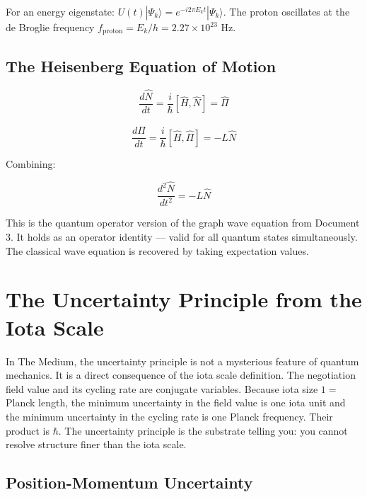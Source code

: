 \documentclass[11pt,letterpaper]{article}
\newenvironment{plainbox}{\begin{tcolorbox}[colback=blue!3!white,colframe=blue!40!white,title={\small\textit{In plain language}},breakable]}{\end{tcolorbox}}
\begin{document}
For an energy eigenstate: \(U(t)|\Psi_k\rangle = e^{-i2\pi E_k t}|\Psi_k\rangle\). The proton oscillates at the de Broglie frequency \(f_\text{proton} = E_k/h = 2.27 \times 10^{23}\) Hz.

\subsection{The Heisenberg Equation of Motion}
\label{sec:org02416fd}

\begin{equation}
\frac{d\hat{N}}{dt} = \frac{i}{\hbar}[\hat{H}, \hat{N}] = \hat{\Pi}
\end{equation}

\begin{equation}
\frac{d\hat{\Pi}}{dt} = \frac{i}{\hbar}[\hat{H}, \hat{\Pi}] = -L\hat{N}
\end{equation}

Combining:

\begin{equation}
\frac{d^2\hat{N}}{dt^2} = -L\hat{N}
\end{equation}

This is the quantum operator version of the graph wave equation from Document 3. It holds as an operator identity --- valid for all quantum states simultaneously. The classical wave equation is recovered by taking expectation values.

\section{The Uncertainty Principle from the Iota Scale}
\label{sec:orgf318974}

\begin{plainbox}
In The Medium, the uncertainty principle is not a mysterious feature of quantum mechanics. It is a direct consequence of the iota scale definition. The negotiation field value and its cycling rate are conjugate variables. Because iota size $1 =$ Planck length, the minimum uncertainty in the field value is one iota unit and the minimum uncertainty in the cycling rate is one Planck frequency. Their product is $\hbar$. The uncertainty principle is the substrate telling you: you cannot resolve structure finer than the iota scale.
\end{plainbox}

\subsection{Position-Momentum Uncertainty}
\label{sec:orge309bc1}
\end{document}
